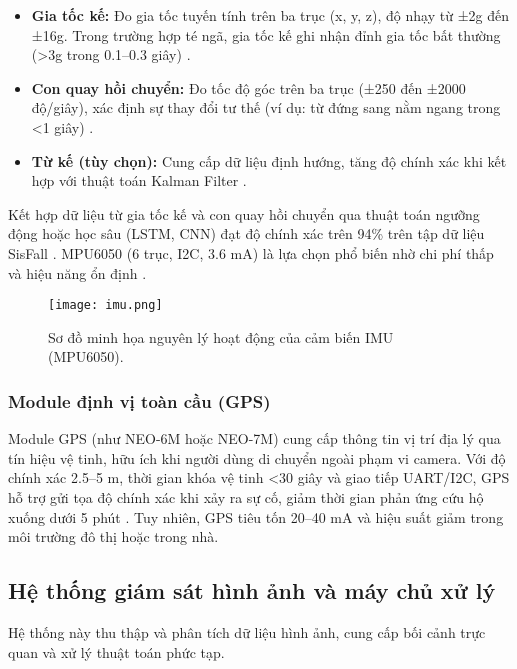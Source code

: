 \begin{itemize}
    \item \textbf{Gia tốc kế:} Đo gia tốc tuyến tính trên ba trục (x, y, z), độ nhạy từ ±2g đến ±16g. Trong trường hợp té ngã, gia tốc kế ghi nhận đỉnh gia tốc bất thường (>3g trong 0.1--0.3 giây) \cite{xu2023}.
    \item \textbf{Con quay hồi chuyển:} Đo tốc độ góc trên ba trục (±250 đến ±2000 độ/giây), xác định sự thay đổi tư thế (ví dụ: từ đứng sang nằm ngang trong <1 giây) \cite{hussain2019}.
    \item \textbf{Từ kế (tùy chọn):} Cung cấp dữ liệu định hướng, tăng độ chính xác khi kết hợp với thuật toán Kalman Filter \cite{alarifi2021}.
\end{itemize}

Kết hợp dữ liệu từ gia tốc kế và con quay hồi chuyển qua thuật toán ngưỡng động hoặc học sâu (LSTM, CNN) đạt độ chính xác trên 94\% trên tập dữ liệu SisFall \cite{hussain2019}. MPU6050 (6 trục, I2C, 3.6 mA) là lựa chọn phổ biến nhờ chi phí thấp và hiệu năng ổn định \cite{iotproject2024}.

\begin{figure}[ht]
    \centering
    \texttt{[image: imu.png]}
    \caption{Sơ đồ minh họa nguyên lý hoạt động của cảm biến IMU (MPU6050).}
    \label{fig:imu_working_principle}
\end{figure}

\subsubsection{Module định vị toàn cầu (GPS)}
Module GPS (như NEO-6M hoặc NEO-7M) cung cấp thông tin vị trí địa lý qua tín hiệu vệ tinh, hữu ích khi người dùng di chuyển ngoài phạm vi camera. Với độ chính xác 2.5--5 m, thời gian khóa vệ tinh <30 giây và giao tiếp UART/I2C, GPS hỗ trợ gửi tọa độ chính xác khi xảy ra sự cố, giảm thời gian phản ứng cứu hộ xuống dưới 5 phút \cite{ublox2023, xu2023}. Tuy nhiên, GPS tiêu tốn 20--40 mA và hiệu suất giảm trong môi trường đô thị hoặc trong nhà.

\subsection{Hệ thống giám sát hình ảnh và máy chủ xử lý}

Hệ thống này thu thập và phân tích dữ liệu hình ảnh, cung cấp bối cảnh trực quan và xử lý thuật toán phức tạp.

